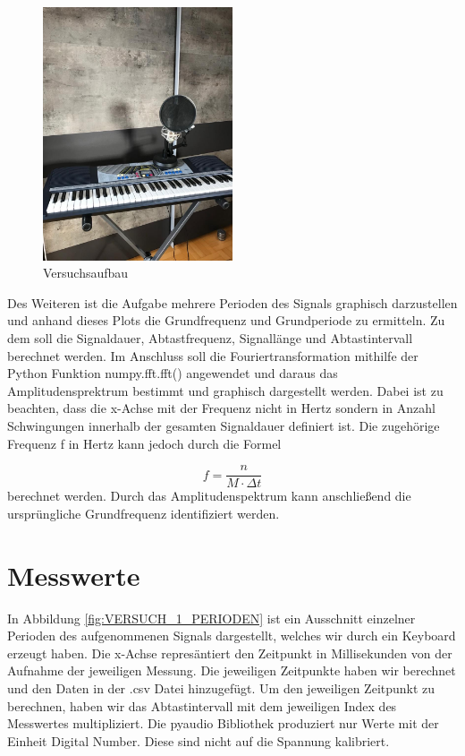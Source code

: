\documentclass[12pt, oneside, a4paper, \docLanguage]{report}
\begin{document}
\begin{figure}[H]
	\centering\small
	\includegraphics[width=0.5\textwidth]{media/Versuchsaufbau.png}
	\caption{Versuchsaufbau}
	\label{fig:VERSUCH_1_VERSUCHSAUFBAU}
\end{figure}

Des Weiteren ist die Aufgabe mehrere Perioden des Signals graphisch darzustellen und anhand dieses Plots die Grundfrequenz und Grundperiode zu ermitteln. Zu dem soll die Signaldauer, Abtastfrequenz, Signallänge und Abtastintervall berechnet werden.
Im Anschluss soll die Fouriertransformation mithilfe der Python Funktion numpy.fft.fft() angewendet und daraus das Amplitudensprektrum bestimmt und graphisch dargestellt werden. Dabei ist zu beachten, dass die x-Achse mit der Frequenz nicht in Hertz sondern in Anzahl Schwingungen innerhalb der gesamten Signaldauer definiert ist. Die zugehörige Frequenz f in Hertz kann jedoch durch die Formel 

\begin{equation*}
	f = \frac{n}{M \cdot \Delta t}
\end{equation*}
berechnet werden. Durch das Amplitudenspektrum kann anschließend die ursprüngliche Grundfrequenz identifiziert werden.
\newpage
\section{Messwerte}
\label{chap:VERSUCH_1_MESSWERTE}
In Abbildung \ref{fig:VERSUCH_1_PERIODEN} ist ein Ausschnitt einzelner Perioden des aufgenommenen Signals dargestellt, welches wir durch ein Keyboard erzeugt haben. Die x-Achse represäntiert den Zeitpunkt in Millisekunden von der Aufnahme der jeweiligen Messung. Die jeweiligen Zeitpunkte haben wir berechnet und den Daten in der .csv Datei hinzugefügt.
Um den jeweiligen Zeitpunkt zu berechnen, haben wir das Abtastintervall mit dem jeweiligen Index des Messwertes multipliziert. Die pyaudio Bibliothek produziert nur Werte mit der Einheit Digital Number. Diese sind nicht auf die Spannung kalibriert.
\end{document}
